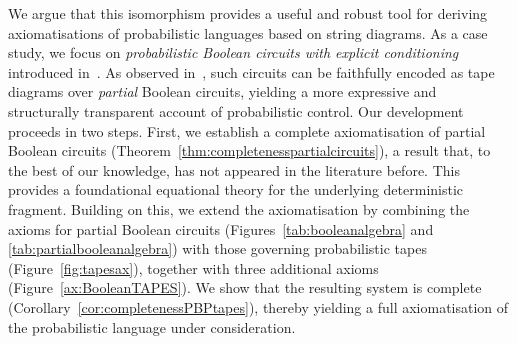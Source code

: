 We argue that this isomorphism provides a useful and robust tool for deriving axiomatisations of probabilistic languages based on string diagrams. As a case study, we focus on \emph{probabilistic Boolean circuits with explicit conditioning} introduced in~\cite{piedeleu2025boolean}. As observed in~\cite[Example~30]{bonchi2025tapediagramsmonoidalmonads}, such circuits can be faithfully encoded as tape diagrams over \emph{partial} Boolean circuits, yielding a more expressive and structurally transparent account of probabilistic control. Our development proceeds in two steps. First, we establish a complete axiomatisation of partial Boolean circuits (Theorem~\ref{thm:completenesspartialcircuits}), a result that, to the best of our knowledge, has not appeared in the literature before. This provides a foundational equational theory for the underlying deterministic fragment. Building on this, we extend the axiomatisation by combining the axioms for partial Boolean circuits (Figures~\ref{tab:booleanalgebra} and \ref{tab:partialbooleanalgebra}) with those governing probabilistic tapes (Figure~\ref{fig:tapesax}), together with three additional axioms (Figure~\ref{ax:BooleanTAPES}). We show that the resulting system is complete (Corollary~\ref{cor:completenessPBPtapes}), thereby yielding a full axiomatisation of the probabilistic language under consideration.

\medskip

